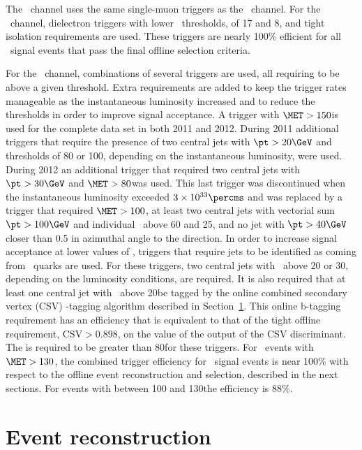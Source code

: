 \documentclass[11pt,twoside,a4paper,cmspaper,final,collab]{cms-tdr}
\begin{document}
The \ZmmH\ channel uses the same single-muon triggers as the \WmnH\
channel. For the \ZeeH\ channel, dielectron triggers with lower \pt\
thresholds, of 17 and 8\GeV, and tight isolation requirements are used.
These triggers are nearly 100\% efficient for all \ZllH\  signal events that pass the
final offline selection criteria.

For the \ZnnH\ channel, combinations of several triggers are
used, all requiring \MET to be
above a given threshold. Extra requirements are added to
keep the trigger rates manageable as the instantaneous luminosity increased and to reduce
the \MET thresholds in order to improve signal
acceptance.
A trigger with $\MET >150$\GeV is used for the complete
data set in both 2011 and 2012. During 2011 additional
triggers that require the
presence of two central jets with $\pt >20\GeV$ and \MET thresholds
of 80 or 100\GeV, depending on the instantaneous luminosity, were used.
During 2012 an additional trigger that
required two central jets with $\pt >30\GeV$ and  $\MET>80$\GeV was used. This last trigger was discontinued when the instantaneous
luminosity exceeded $3\times 10^{33}\percms$
and was replaced by a trigger that required $\MET>100$\GeV,
at least two central jets with vectorial sum $\pt>100\GeV$
and individual \pt\ above 60 and 25\GeV, and no jet
with $\pt>40\GeV$ closer than 0.5 in azimuthal angle to the
\MET direction. In order to increase signal acceptance at lower values of \MET,
triggers that require jets to be identified as coming from \cPqb\ quarks
are used. For these triggers, two central jets with \pt\ above 20 or 30\GeV,
depending on the luminosity conditions, are required. It is also
required that at least one central jet with \pt\ above 20\GeV be
tagged by the online combined secondary vertex (CSV) \cPqb-tagging
algorithm described in
Section~\ref{sec:hbb_Event_Reconstruction}. This online
b-tagging requirement has an efficiency that is equivalent to that of the tight
offline requirement, $\mathrm{CSV} >0.898$, on the value of the output of the CSV discriminant. The \MET is required to
be greater than 80\GeV for these triggers. For \ZnnH\ events with $\MET >130$\GeV, the combined
trigger efficiency for \ZnnH\ signal events is near 100\% with
respect to the offline event reconstruction and selection, described
in the next sections. For events with \MET between 100 and 130\GeV the
efficiency is 88\%.



\section{Event reconstruction}\label{sec:hbb_Event_Reconstruction}
\end{document}
